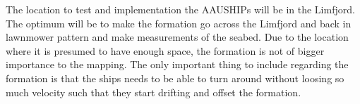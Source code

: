 The location to test and implementation the AAUSHIPs will be in the Limfjord. The optimum will be to make the formation go across the Limfjord and back in lawnmower pattern and make measurements of the seabed. Due to the location where it is presumed to have enough space, the formation is not of bigger importance to the mapping. The only important thing to include regarding the formation is that the ships needs to be able to turn around without loosing so much velocity such that they start drifting and offset the formation.
